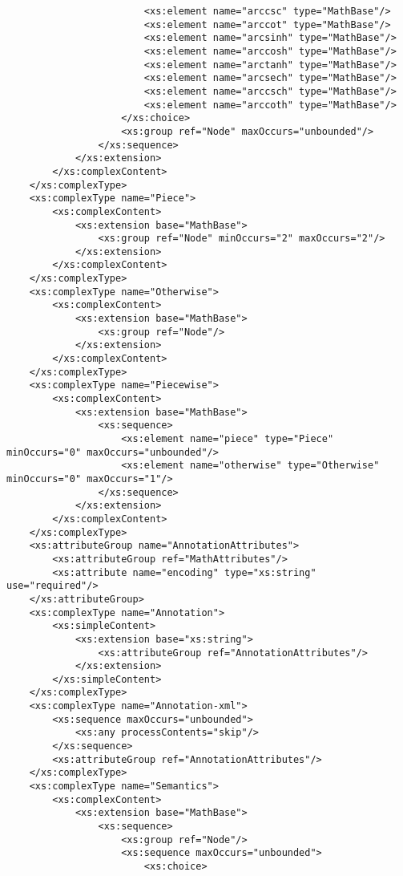 \begin{footnotesize}
\begin{verbatim}
                        <xs:element name="arccsc" type="MathBase"/>
                        <xs:element name="arccot" type="MathBase"/>
                        <xs:element name="arcsinh" type="MathBase"/>
                        <xs:element name="arccosh" type="MathBase"/>
                        <xs:element name="arctanh" type="MathBase"/>
                        <xs:element name="arcsech" type="MathBase"/>
                        <xs:element name="arccsch" type="MathBase"/>
                        <xs:element name="arccoth" type="MathBase"/>
                    </xs:choice>
                    <xs:group ref="Node" maxOccurs="unbounded"/>
                </xs:sequence>
            </xs:extension>
        </xs:complexContent>
    </xs:complexType>
    <xs:complexType name="Piece">
        <xs:complexContent>
            <xs:extension base="MathBase">
                <xs:group ref="Node" minOccurs="2" maxOccurs="2"/>
            </xs:extension>
        </xs:complexContent>
    </xs:complexType>
    <xs:complexType name="Otherwise">
        <xs:complexContent>
            <xs:extension base="MathBase">
                <xs:group ref="Node"/>
            </xs:extension>
        </xs:complexContent>
    </xs:complexType>
    <xs:complexType name="Piecewise">
        <xs:complexContent>
            <xs:extension base="MathBase">
                <xs:sequence>
                    <xs:element name="piece" type="Piece" minOccurs="0" maxOccurs="unbounded"/>
                    <xs:element name="otherwise" type="Otherwise" minOccurs="0" maxOccurs="1"/>
                </xs:sequence>
            </xs:extension>
        </xs:complexContent>
    </xs:complexType>
    <xs:attributeGroup name="AnnotationAttributes">
        <xs:attributeGroup ref="MathAttributes"/>
        <xs:attribute name="encoding" type="xs:string" use="required"/>
    </xs:attributeGroup>
    <xs:complexType name="Annotation">
        <xs:simpleContent>
            <xs:extension base="xs:string">
                <xs:attributeGroup ref="AnnotationAttributes"/>
            </xs:extension>
        </xs:simpleContent>
    </xs:complexType>
    <xs:complexType name="Annotation-xml">
        <xs:sequence maxOccurs="unbounded">
            <xs:any processContents="skip"/>
        </xs:sequence>
        <xs:attributeGroup ref="AnnotationAttributes"/>
    </xs:complexType>
    <xs:complexType name="Semantics">
        <xs:complexContent>
            <xs:extension base="MathBase">
                <xs:sequence>
                    <xs:group ref="Node"/>
                    <xs:sequence maxOccurs="unbounded">
                        <xs:choice>

\end{verbatim}
\end{footnotesize}
